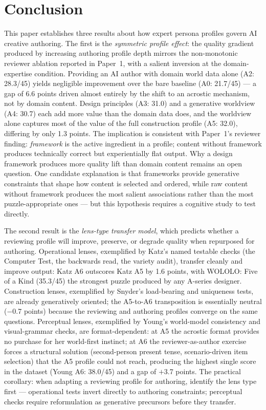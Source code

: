 \section{Conclusion}

This paper establishes three results about how expert persona profiles govern AI creative authoring.
The first is the \textit{symmetric profile effect}: the quality gradient produced by increasing authoring profile depth mirrors the non-monotonic reviewer ablation reported in Paper~1, with a salient inversion at the domain-expertise condition.
Providing an AI author with domain world data alone (A2: 28.3/45) yields negligible improvement over the bare baseline (A0: 21.7/45) --- a gap of 6.6 points driven almost entirely by the shift to an acrostic mechanism, not by domain content.
Design principles (A3: 31.0) and a generative worldview (A4: 30.7) each add more value than the domain data does, and the worldview alone captures most of the value of the full construction profile (A5: 32.0), differing by only 1.3 points.
The implication is consistent with Paper~1's reviewer finding: \textit{framework} is the active ingredient in a profile; content without framework produces technically correct but experientially flat output.
Why a design framework produces more quality lift than domain content remains an open question.
One candidate explanation is that frameworks provide generative constraints that shape how content is selected and ordered, while raw content without framework produces the most salient associations rather than the most puzzle-appropriate ones --- but this hypothesis requires a cognitive study to test directly.

The second result is the \textit{lens-type transfer model}, which predicts whether a reviewing profile will improve, preserve, or degrade quality when repurposed for authoring.
Operational lenses, exemplified by Katz's named testable checks (the Computer Test, the backwards read, the variety audit), transfer cleanly and improve output: Katz A6 outscores Katz A5 by 1.6 points, with WOLOLO: Five of a Kind (35.3/45) the strongest puzzle produced by any A-series designer.
Construction lenses, exemplified by Snyder's load-bearing and uniqueness tests, are already generatively oriented; the A5-to-A6 transposition is essentially neutral ($-$0.7 points) because the reviewing and authoring profiles converge on the same questions.
Perceptual lenses, exemplified by Young's world-model consistency and visual-grammar checks, are format-dependent: at A5 the acrostic format provides no purchase for her world-first instinct; at A6 the reviewer-as-author exercise forces a structural solution (second-person present tense, scenario-driven item selection) that the A5 profile could not reach, producing the highest single score in the dataset (Young A6: 38.0/45) and a gap of $+$3.7 points.
The practical corollary: when adapting a reviewing profile for authoring, identify the lens type first --- operational tests invert directly to authoring constraints; perceptual checks require reformulation as generative precursors before they transfer.

